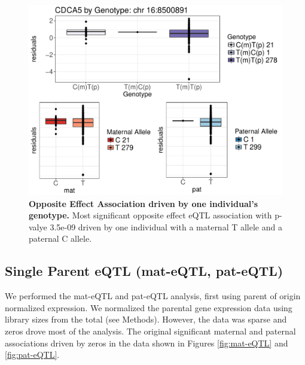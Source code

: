 \begin{figure}[!htb]
\centering \includegraphics[width=6in]{img/ch04/fig-03-oeQTL.pdf}
\caption[Opposite Effect Association driven by one individual's genotype.]{\textbf{Opposite Effect Association driven by one individual's genotype.} Most significant opposite effect eQTL association with p-valye 3.5e-09 driven by one individual with a maternal T allele and a paternal C allele.}
\label{fig:oeQTL3}
\end{figure}



\subsection{Single Parent eQTL (mat-eQTL, pat-eQTL)}\label{Single Parent eQTL (mat-eQTL, pat-eQTL)} 
We performed the mat-eQTL and pat-eQTL analysis, first using parent of origin normalized expression. We normalized the parental gene expression data using library sizes from the total (see Methods). However, the data was sparse and zeros drove most of the analysis. The original significant maternal and paternal associations driven by zeros in the data shown in Figures \ref{fig:mat-eQTL} and \ref{fig:pat-eQTL}. 

